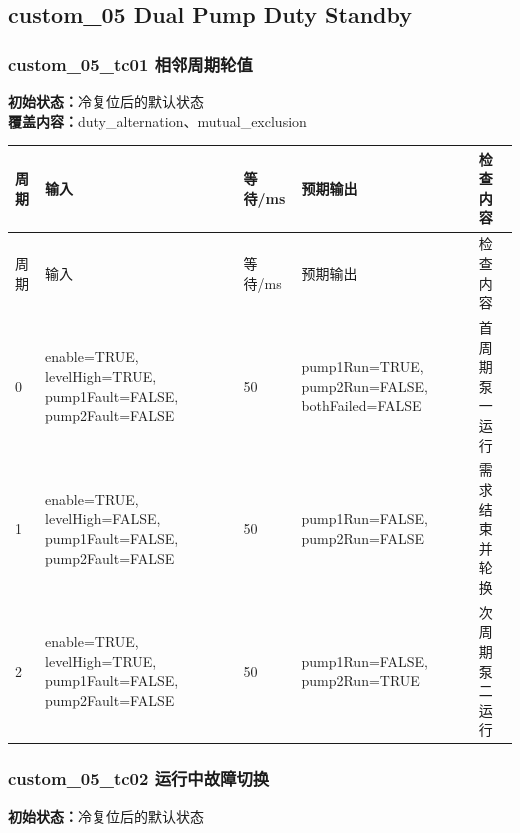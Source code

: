\subsection{{\ttfamily custom\_05} Dual Pump Duty Standby}

\subsubsection{{\ttfamily custom\_05\_tc01} 相邻周期轮值}

\noindent\textbf{初始状态：}冷复位后的默认状态\\

\textbf{覆盖内容：}duty\_alternation、mutual\_exclusion

\begin{longtable}{L{1.0cm}L{4.7cm}L{1.4cm}L{4.0cm}L{2.1cm}}

\toprule

周期 & 输入 & 等待/ms & 预期输出 & 检查内容\\

\midrule

\endfirsthead

\toprule

周期 & 输入 & 等待/ms & 预期输出 & 检查内容\\

\midrule

\endhead

0 & enable=TRUE, levelHigh=TRUE, pump1Fault=FALSE, pump2Fault=FALSE & 50 & pump1Run=TRUE, pump2Run=FALSE, bothFailed=FALSE & 首周期泵一运行\\

1 & enable=TRUE, levelHigh=FALSE, pump1Fault=FALSE, pump2Fault=FALSE & 50 & pump1Run=FALSE, pump2Run=FALSE & 需求结束并轮换\\

2 & enable=TRUE, levelHigh=TRUE, pump1Fault=FALSE, pump2Fault=FALSE & 50 & pump1Run=FALSE, pump2Run=TRUE & 次周期泵二运行\\

\bottomrule

\end{longtable}

\subsubsection{{\ttfamily custom\_05\_tc02} 运行中故障切换}

\noindent\textbf{初始状态：}冷复位后的默认状态\\

